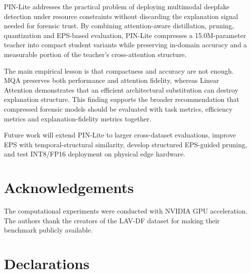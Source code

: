\documentclass[pdflatex,sn-basic,Numbered]{sn-jnl}
\begin{document}
PIN-Lite addresses the practical problem of deploying multimodal deepfake detection under resource constraints without discarding the explanation signal needed for forensic trust. By combining attention-aware distillation, pruning, quantization and EPS-based evaluation, PIN-Lite compresses a 15.0M-parameter teacher into compact student variants while preserving in-domain accuracy and a measurable portion of the teacher's cross-attention structure.

The main empirical lesson is that compactness and accuracy are not enough. MQA preserves both performance and attention fidelity, whereas Linear Attention demonstrates that an efficient architectural substitution can destroy explanation structure. This finding supports the broader recommendation that compressed forensic models should be evaluated with task metrics, efficiency metrics and explanation-fidelity metrics together.

Future work will extend PIN-Lite to larger cross-dataset evaluations, improve EPS with temporal-structural similarity, develop structured EPS-guided pruning, and test INT8/FP16 deployment on physical edge hardware.

\backmatter

\section*{Acknowledgements}

The computational experiments were conducted with NVIDIA GPU acceleration. The authors thank the creators of the LAV-DF dataset for making their benchmark publicly available.

\section*{Declarations}
\end{document}
